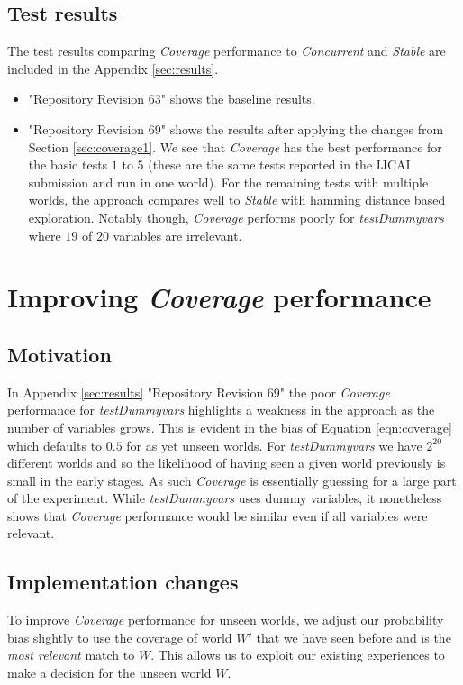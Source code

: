 \documentclass[a4paper]{article}
\newcommand{\cc}{\emph{Concurrent}\xspace}
\newcommand{\st}{\emph{Stable}\xspace}
\newcommand{\cov}{\emph{Coverage}\xspace}
\begin{document}
\subsection{Test results}
The test results comparing \cov performance to \cc and \st are included in the Appendix \ref{sec:results}.
\begin{itemize}
\item "Repository Revision 63" shows the baseline results.
\item "Repository Revision 69" shows the results after applying the changes from Section \ref{sec:coverage1}. We see that \cov has the best performance for the basic tests $1$ to $5$ (these are the same tests reported in the IJCAI submission and run in one world). For the remaining tests with multiple worlds, the approach compares well to \st with hamming distance based exploration. Notably though, \cov performs poorly for \textit{testDummyvars} where $19$ of $20$ variables are irrelevant.
\end{itemize}

\section{Improving {\cov} performance}
\label{sec:coverage2}

\subsection{Motivation}
\label{subsec:coverage2-motivation}

In Appendix \ref{sec:results} "Repository Revision 69" the poor \cov performance for \textit{testDummyvars} highlights a weakness in the approach as the number of variables grows. This is evident in the bias of Equation \ref{eqn:coverage} which defaults to $0.5$ for as yet unseen worlds. For \textit{testDummyvars} we have $2^{20}$ different worlds and so the likelihood of having seen a given world previously is small in the early stages. As such \cov is essentially guessing for a large part of the experiment. While \textit{testDummyvars} uses dummy variables, it nonetheless shows that \cov performance would be similar even if all variables were relevant.


\subsection{Implementation changes}
\label{subsec:coverage2-implementation}

To improve \cov performance for unseen worlds, we adjust our probability bias slightly to use the coverage of world $W'$ that we have seen before and is the \textit{most relevant} match to $W$. This allows us to exploit our existing experiences to make a decision for the unseen world $W$. 
\end{document}
